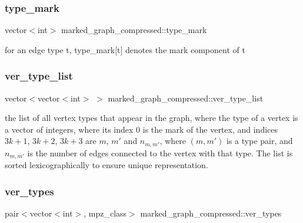 \subsubsection{\texorpdfstring{type\+\_\+mark}{type\_mark}}
{\footnotesize\ttfamily vector$<$int$>$ marked\+\_\+graph\+\_\+compressed\+::type\+\_\+mark}



for an edge type t, type\+\_\+mark\mbox{[}t\mbox{]} denotes the mark component of t 

\mbox{\label{classmarked__graph__compressed_af2e3e55223d436628a02758dfae88493}} 
\subsubsection{\texorpdfstring{ver\+\_\+type\+\_\+list}{ver\_type\_list}}
{\footnotesize\ttfamily vector$<$vector$<$int$>$ $>$ marked\+\_\+graph\+\_\+compressed\+::ver\+\_\+type\+\_\+list}



the list of all vertex types that appear in the graph, where the type of a vertex is a vector of integers, where its index 0 is the mark of the vertex, and indices $3k+1$, $3k+2$, $3k+3$ are $m$, $m'$ and $n_{m,m'}$, where $(m,m')$ is a type pair, and $n_{m,m'}$ is the number of edges connected to the vertex with that type. The list is sorted lexicographically to ensure unique representation. 

\mbox{\label{classmarked__graph__compressed_af446cc5e23c241a92b76642fd5ebc403}} 
\subsubsection{\texorpdfstring{ver\+\_\+types}{ver\_types}}
{\footnotesize\ttfamily pair$<$vector$<$int$>$, mpz\+\_\+class$>$ marked\+\_\+graph\+\_\+compressed\+::ver\+\_\+types}



